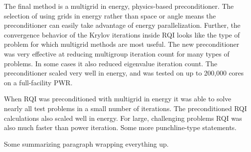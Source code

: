 \vspace*{0.5em}
\noindent       %
The final method is a multigrid in energy, physics-based preconditioner. The selection of using grids in energy rather than space or angle means the preconditioner can easily take advantage of energy parallelization. Further, the convergence behavior of the Krylov iterations inside RQI looks like the type of problem for which multigrid methods are most useful. The new preconditioner was very effective at reducing multigroup iteration count for many types of problems. In some cases it also reduced eigenvalue iteration count. The preconditioner scaled very well in energy, and was tested on up to 200,000 cores on a full-facility PWR.

\vspace*{0.5em}
\noindent       %
When RQI was preconditioned with multigrid in energy it was able to solve nearly all test problems in a small number of iterations. The preconditioned RQI calculations also scaled well in energy. For large, challenging problems RQI was also much faster than power iteration. Some more punchline-type statements.

\vspace*{0.5em}
\noindent       %
Some summarizing paragraph wrapping everything up. 


